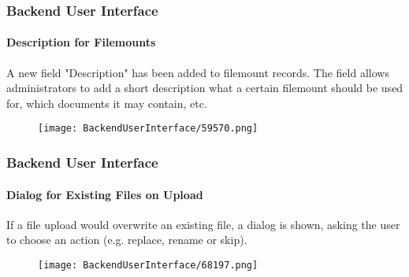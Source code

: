 \begin{frame}[fragile]
	\frametitle{Backend User Interface}
	\framesubtitle{Description for Filemounts}

	A new field "Description" has been added to filemount records.
	The field allows administrators to add a short description what a certain filemount should be used for,
	which documents it may contain, etc.

	\begin{figure}
		\texttt{[image: BackendUserInterface/59570.png]}
	\end{figure}

\end{frame}

\begin{frame}[fragile]
	\frametitle{Backend User Interface}
	\framesubtitle{Dialog for Existing Files on Upload}

	If a file upload would overwrite an existing file, a dialog is shown, asking the user
	to choose an action (e.g. replace, rename or skip).

	\begin{figure}
		\texttt{[image: BackendUserInterface/68197.png]}
	\end{figure}

\end{frame}


